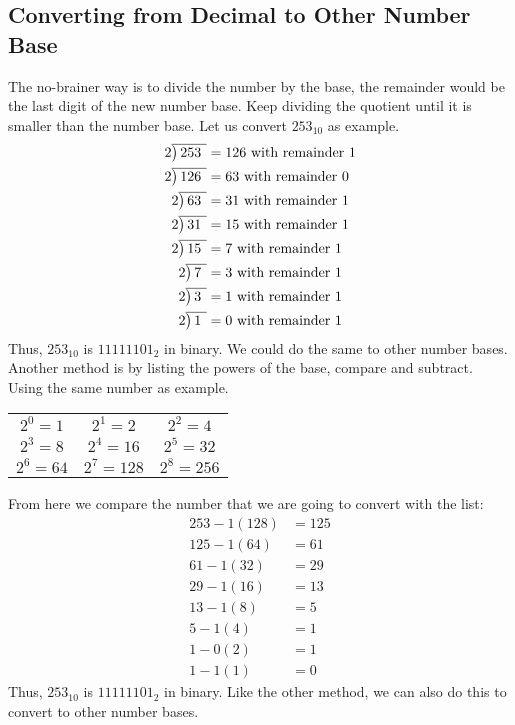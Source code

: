 \subsection{Converting from Decimal to Other Number Base}
\noindent The no-brainer way is to divide the number by the base, the remainder would be the last digit of the new number base. Keep dividing the quotient until it is smaller than the number base. Let us convert $253_{10}$ as example.
\begin{equation} \label{eq5}
\begin{split}
2{\overline{\smash{\big)}\,253\phantom{)}}} & = 126 \text{ with remainder }1\\
2{\overline{\smash{\big)}\,126\phantom{)}}} & = 63 \text{ with remainder }0\\
2{\overline{\smash{\big)}\,63\phantom{)}}} & = 31 \text{ with remainder }1\\
2{\overline{\smash{\big)}\,31\phantom{)}}} & = 15 \text{ with remainder }1\\
2{\overline{\smash{\big)}\,15\phantom{)}}} & = 7 \text{ with remainder }1\\
2{\overline{\smash{\big)}\,7\phantom{)}}} & = 3 \text{ with remainder }1\\
2{\overline{\smash{\big)}\,3\phantom{)}}} & = 1 \text{ with remainder }1\\
2{\overline{\smash{\big)}\,1\phantom{)}}} & = 0 \text{ with remainder }1
\end{split}
\end{equation} 
Thus, $253_{10}$ is $11111101_2$ in binary. We could do the same to other number bases. \newline
Another method is by listing the powers of the base, compare and subtract. Using the same number as example.
\begin{center}
\begin{tabular}{ c c c}
 $2^0 = 1$ & $2^1 = 2$ & $2^2 = 4$ \\ 
 $2^3 = 8$ & $2^4 = 16$ & $2^5 = 32$ \\  
 $2^6 = 64$ & $2^7 = 128$ & $2^8 = 256$  
\end{tabular}
\end{center}
From here we compare the number that we are going to convert with the list:
\begin{equation} \label{eq6}
\begin{split}
253 - 1(128) & = 125  \\
125 - 1(64) & = 61 \\
61 - 1(32) & = 29 \\ 
29 - 1(16) & = 13 \\
13 - 1(8) & = 5 \\
5 - 1(4) & = 1 \\
1 - 0(2) & = 1\\
1- 1(1) & = 0
\end{split}
\end{equation} 
Thus, $253_{10}$ is $11111101_2$ in binary. Like the other method, we can also do this to convert to other number bases.
